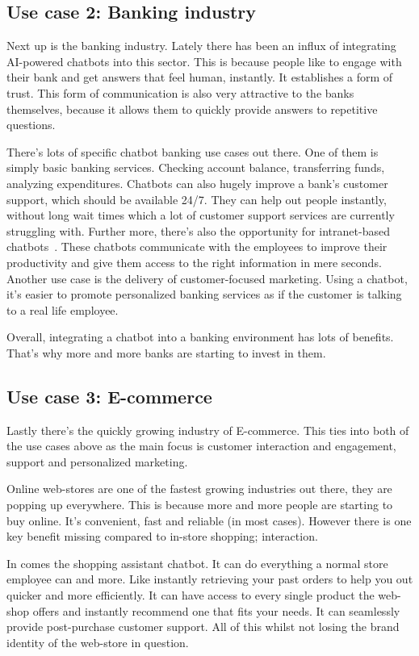 \subsection{Use case 2: Banking industry}

Next up is the banking industry. Lately there has been an influx of integrating AI-powered chatbots into this sector. This is because people like to engage with their bank and get answers that feel human, instantly. It establishes a form of trust. This form of communication is also very attractive to the banks themselves, because it allows them to quickly provide answers to repetitive questions.

There's lots of specific chatbot banking use cases out there. One of them is simply basic banking services. Checking account balance, transferring funds, analyzing expenditures. Chatbots can also hugely improve a bank's customer support, which should be available 24/7. They can help out people instantly, without long wait times which a lot of customer support services are currently struggling with. Further more, there's also the opportunity for intranet-based chatbots~\cite{intranet-chabot}. These chatbots communicate with the employees to improve their productivity and give them access to the right information in mere seconds. Another use case is the delivery of customer-focused marketing. Using a chatbot, it's easier to promote personalized banking services as if the customer is talking to a real life employee.

Overall, integrating a chatbot into a banking environment has lots of benefits. That's why more and more banks are starting to invest in them.

\subsection{Use case 3: E-commerce}

Lastly there's the quickly growing industry of E-commerce. This ties into both of the use cases above as the main focus is customer interaction and engagement, support and personalized marketing.

Online web-stores are one of the fastest growing industries out there, they are popping up everywhere. This is because more and more people are starting to buy online. It's convenient, fast and reliable (in most cases). However there is one key benefit missing compared to in-store shopping; interaction.

In comes the shopping assistant chatbot. It can do everything a normal store employee can and more. Like instantly retrieving your past orders to help you out quicker and more efficiently. It can have access to every single product the web-shop offers and instantly recommend one that fits your needs. It can seamlessly provide post-purchase customer support. All of this whilst not losing the brand identity of the web-store in question.

